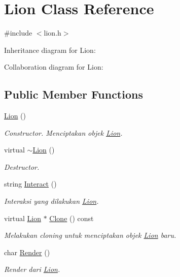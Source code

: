 \hypertarget{classLion}{}\section{Lion Class Reference}
\label{classLion}


{\ttfamily \#include $<$lion.\+h$>$}



Inheritance diagram for Lion\+:


Collaboration diagram for Lion\+:
\subsection*{Public Member Functions}
\begin{DoxyCompactItemize}
\item 
\hyperlink{classLion_a582202364024a9ce10e57f47c872dbc2}{Lion} ()
\begin{DoxyCompactList}\small\item\em Constructor. Menciptakan objek \hyperlink{classLion}{Lion}. \end{DoxyCompactList}\item 
virtual \hyperlink{classLion_a09c9c113e6ca2d7c7b304b009d61dc62}{$\sim$\+Lion} ()
\begin{DoxyCompactList}\small\item\em Destructor. \end{DoxyCompactList}\item 
string \hyperlink{classLion_a4c090a9b5f42b92c30d223b40435e167}{Interact} ()
\begin{DoxyCompactList}\small\item\em Interaksi yang dilakukan \hyperlink{classLion}{Lion}. \end{DoxyCompactList}\item 
virtual \hyperlink{classLion}{Lion} $\ast$ \hyperlink{classLion_ae63405ef106650644a8fcafc7393284e}{Clone} () const 
\begin{DoxyCompactList}\small\item\em Melakukan cloning untuk menciptakan objek \hyperlink{classLion}{Lion} baru. \end{DoxyCompactList}\item 
char \hyperlink{classLion_ad782de7c88e4a7aad01287a2ed64827c}{Render} ()
\begin{DoxyCompactList}\small\item\em Render dari \hyperlink{classLion}{Lion}. \end{DoxyCompactList}\end{DoxyCompactItemize}
